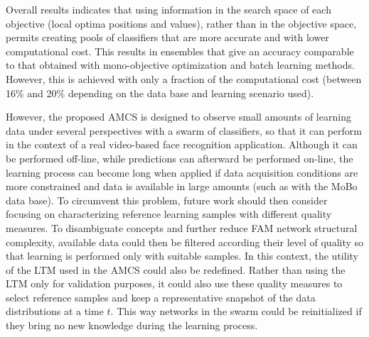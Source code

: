 Overall results indicates that using information in the search space of each objective (local optima positions and values), rather than in the objective space, permits creating pools of classifiers that are more accurate and with lower computational cost.
This results in ensembles that give an accuracy comparable to that obtained with mono-objective optimization and batch learning methods.
However, this is achieved with only a fraction of the computational cost (between 16\% and 20\% depending on the data base and learning scenario used).

However, the proposed AMCS is designed to observe small amounts of learning data under several perspectives with a swarm of classifiers, so that it can perform in the context of a real video-based face recognition application.
Although it can be performed off-line, while predictions can afterward be performed on-line, the learning process can become long when applied if data acquisition conditions are more constrained and data is available in large amounts (such as with the MoBo data base).
To circumvent this problem, future work should then consider focusing on 
characterizing reference learning samples with different quality measures.
To disambiguate concepts and further reduce FAM network structural complexity, available data could then be filtered according their level of quality so that learning is performed only with suitable samples.
In this context, the utility of the LTM used in the AMCS could also be redefined.
Rather than using the LTM only for validation purposes, it could also use these 
quality measures to select reference samples and keep a representative snapshot of the data distributions at a time $t$.
This way networks in the swarm could be reinitialized if they bring no new knowledge during the learning process.